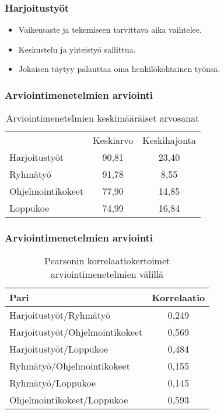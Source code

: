 \documentclass[finnish]{beamer}
\begin{document}
\frame
{
  \frametitle{Harjoitustyöt}
  \begin{itemize}
    \item Vaikeusaste ja tekemiseen tarvittava aika vaihtelee.
    \item Keskustelu ja yhteistyö sallittua.
    \item Jokaisen täytyy palauttaa oma henkilökohtainen työnsä.
  \end{itemize}
}

\frame
{
  \frametitle{Arviointimenetelmien arviointi}
  \begin{table}
    \begin{tabular}{ l | c c }
       & Keskiarvo & Keskihajonta \\
      Harjoitustyöt & 90,81 & 23,40 \\
      Ryhmätyö & 91,78 & 8,55 \\
      Ohjelmointikokeet & 77,90 & 14,85 \\
      Loppukoe & 74,99 & 16,84 \\
    \end{tabular}
  \caption{Arviointimenetelmien keskimääräiset arvosanat}
  \label{tab:arviointimenetelmat}
  \end{table}
}

\frame
{
  \frametitle{Arviointimenetelmien arviointi}
  \begin{table}
    \begin{tabular}{ l c }
      Pari & Korrelaatio \\
      \hline
      Harjoitustyöt/Ryhmätyö & 0,249 \\
      Harjoitustyöt/Ohjelmointikokeet & 0,569 \\
      Harjoitustyöt/Loppukoe & 0,484 \\
      Ryhmätyö/Ohjelmointikokeet & 0,155 \\
      Ryhmätyö/Loppukoe & 0,145 \\
      Ohjelmointikokeet/Loppukoe & 0,593 \\
    \end{tabular}
  \caption{Pearsonin korrelaatiokertoimet arviointimenetelmien välillä}
  \label{tab:korrelaatiot}
  \end{table}
}
\end{document}
